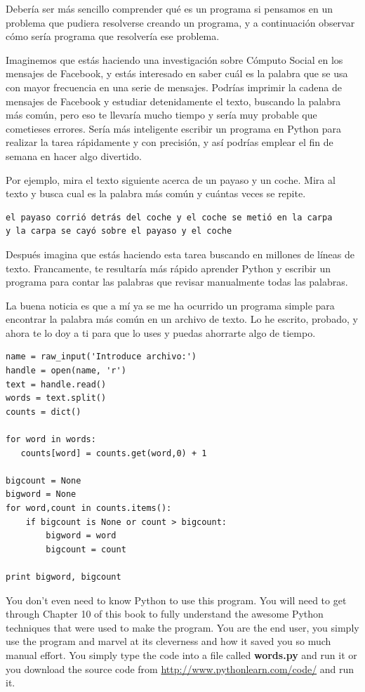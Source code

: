 Debería ser más sencillo comprender qué es un programa si pensamos en un problema
que pudiera resolverse creando un programa, y a continuación observar cómo sería programa
que resolvería ese problema.

Imaginemos que estás haciendo una investigación sobre Cómputo Social en los mensajes
de Facebook, y estás interesado en saber cuál es la palabra que se usa con mayor frecuencia
en una serie de mensajes. Podrías imprimir la cadena de mensajes de Facebook y estudiar
detenidamente el texto, buscando la palabra más común, pero eso te llevaría mucho tiempo
y sería muy probable que cometieses errores. Sería más inteligente escribir un programa
en Python para realizar la tarea rápidamente y con precisión, y así podrías emplear el fin
de semana en hacer algo divertido.

Por ejemplo, mira el texto siguiente acerca de un payaso y un coche. Mira al
texto y busca cual es la palabra más común y cuántas veces se repite.

\beforeverb
\begin{verbatim}
el payaso corrió detrás del coche y el coche se metió en la carpa
y la carpa se cayó sobre el payaso y el coche
\end{verbatim}
\afterverb
%
Después imagina que estás haciendo esta tarea buscando en millones de líneas de
texto. Francamente, te resultaría más rápido aprender Python y escribir un
programa para contar las palabras que revisar manualmente todas las palabras.

La buena noticia es que a mí ya se me ha ocurrido un programa
simple para encontrar la palabra más común en un archivo de texto. Lo he escrito,
probado, y ahora te lo doy a ti para que lo uses y puedas ahorrarte algo de tiempo.

\beforeverb
\begin{verbatim}
name = raw_input('Introduce archivo:')
handle = open(name, 'r')
text = handle.read()
words = text.split()
counts = dict()

for word in words:
   counts[word] = counts.get(word,0) + 1

bigcount = None
bigword = None
for word,count in counts.items():
    if bigcount is None or count > bigcount:
        bigword = word
        bigcount = count

print bigword, bigcount
\end{verbatim}
\afterverb
%
You don't even need to know Python to use this program.  You will need to get through 
Chapter 10 of this book to fully understand the awesome Python techniques that were
used to make the program.  You are the end user, you simply use the program and marvel
at its cleverness and how it saved you so much manual effort.
You simply type the code 
into a file called {\bf words.py} and run it or you download the source 
code from \url{http://www.pythonlearn.com/code/} and run it.

